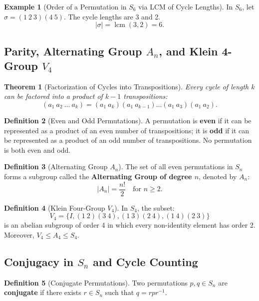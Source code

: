\documentclass[12pt]{article}
\theoremstyle{definition}
\newtheorem{definition}{Definition}[section]
\newtheorem{example}[definition]{Example}
\theoremstyle{plain}
\newtheorem{theorem}{Theorem}[section]
\begin{document}
\begin{example}[Order of a Permutation in $S_6$ via LCM of Cycle Lengths]
In $S_6$, let $\sigma = (1\ 2\ 3)(4\ 5)$. The cycle lengths are 3 and 2.
\[
|\sigma| = \operatorname{lcm}(3, 2) = 6.
\]
\end{example}

\subsection{Parity, Alternating Group \texorpdfstring{$A_n$}{An}, and Klein 4-Group \texorpdfstring{$V_4$}{V4}}

\begin{theorem}[Factorization of Cycles into Transpositions]
Every cycle of length $k$ can be factored into a product of $k - 1$ transpositions:
\[
(a_1\ a_2\ \dots\ a_k) = (a_1\ a_k)(a_1\ a_{k-1})\dots(a_1\ a_3)(a_1\ a_2).
\]
\end{theorem}

\begin{definition}[Even and Odd Permutations]
A permutation is \textbf{even} if it can be represented as a product of an even number of transpositions; it is \textbf{odd} if it can be represented as a product of an odd number of transpositions.
No permutation is both even and odd.
\end{definition}

\begin{definition}[Alternating Group $A_n$]
The set of all even permutations in $S_n$ forms a subgroup called the \textbf{Alternating Group of degree $n$}, denoted by $A_n$:
\[
|A_n| = \frac{n!}{2} \quad \text{for } n \ge 2.
\]
\end{definition}

\begin{definition}[Klein Four-Group $V_4$]
In $S_4$, the subset:
\[
V_4 = \{I, (1\ 2)(3\ 4), (1\ 3)(2\ 4), (1\ 4)(2\ 3)\}
\]
is an abelian subgroup of order 4 in which every non-identity element has order 2. Moreover, $V_4 \le A_4 \le S_4$.
\end{definition}

\subsection{Conjugacy in \texorpdfstring{$S_n$}{Sn} and Cycle Counting}

\begin{definition}[Conjugate Permutations]
Two permutations $p, q \in S_n$ are \textbf{conjugate} if there exists $r \in S_n$ such that $q = r p r^{-1}$.
\end{definition}
\end{document}
